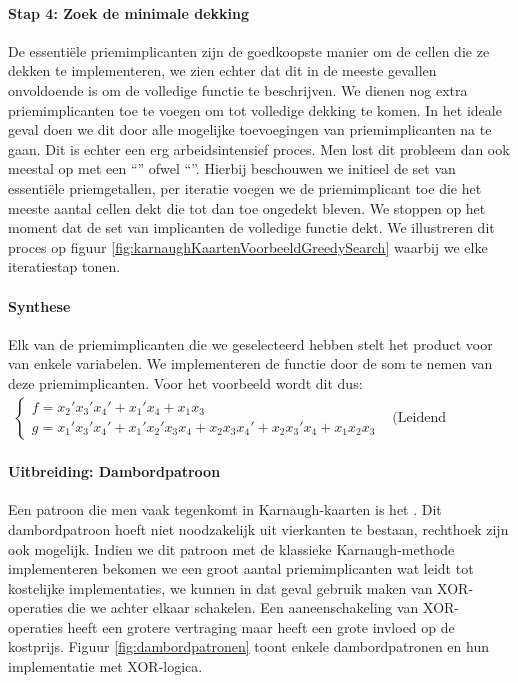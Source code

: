 \paragraph{Stap 4: Zoek de minimale dekking}
De essenti\"ele priemimplicanten zijn de goedkoopste manier om de cellen die ze dekken te implementeren, we zien echter dat dit in de meeste gevallen onvoldoende is om de volledige functie te beschrijven. We dienen nog extra priemimplicanten toe te voegen om tot volledige dekking te komen. In het ideale geval doen we dit door alle mogelijke toevoegingen van priemimplicanten na te gaan. Dit is echter een erg arbeidsintensief proces. Men lost dit probleem dan ook meestal op met een ``'' ofwel ``''. Hierbij beschouwen we initieel de set van essenti\"ele priemgetallen, per iteratie voegen we de priemimplicant toe die het meeste aantal cellen dekt die tot dan toe ongedekt bleven. We stoppen op het moment dat de set van implicanten de volledige functie dekt. We illustreren dit proces op figuur \ref{fig:karnaughKaartenVoorbeeldGreedySearch} waarbij we elke iteratiestap tonen.
\paragraph{Synthese}
Elk van de priemimplicanten die we geselecteerd hebben stelt het product voor van enkele variabelen. We implementeren de functie door de som te nemen van deze priemimplicanten. Voor het voorbeeld wordt dit dus:
\begin{equation}
\begin{array}{ll}
\left\{
\begin{array}{l}
f=x_2'x_3'x_4'+x_1'x_4+x_1x_3\\
g=x_1'x_3'x_4'+x_1'x_2'x_3x_4+x_2x_3x_4'+x_2x_3'x_4+x_1x_2x_3
\end{array}\right.&\mbox{(Leidend voorbeeld)}
\end{array}
\end{equation}
\paragraph{Uitbreiding: Dambordpatroon}
Een patroon die men vaak tegenkomt in Karnaugh-kaarten is het . Dit dambordpatroon hoeft niet noodzakelijk uit vierkanten te bestaan, rechthoek zijn ook mogelijk. Indien we dit patroon met de klassieke Karnaugh-methode implementeren bekomen we een groot aantal priemimplicanten wat leidt tot kostelijke implementaties, we kunnen in dat geval gebruik maken van XOR-operaties die we achter elkaar schakelen. Een aaneenschakeling van XOR-operaties heeft een grotere vertraging maar heeft een grote invloed op de kostprijs. Figuur \ref{fig:dambordpatronen} toont enkele dambordpatronen en hun implementatie met XOR-logica.
